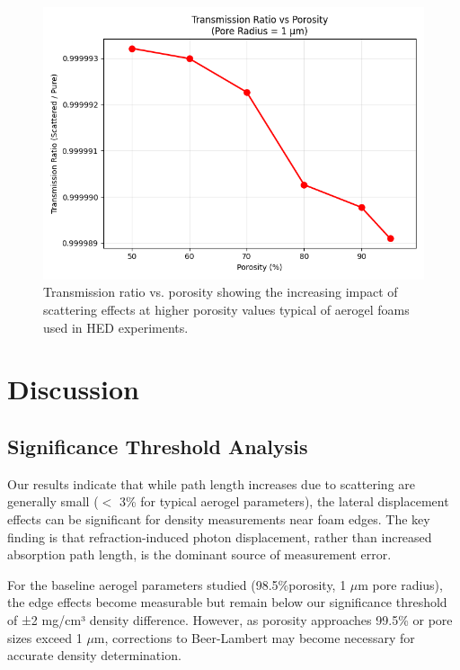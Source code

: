 \documentclass[twocolumn]{aastex701}
\begin{document}
\begin{figure}[htbp]
  \centering
  \includegraphics[width=\linewidth]{transmissionvsporosity1.png}
  \caption{Transmission ratio vs. porosity showing the increasing impact of scattering effects at higher porosity values typical of aerogel foams used in HED experiments.}
  \label{fig:transporeosity}
\end{figure}

\section{Discussion}

\subsection{Significance Threshold Analysis}

Our results indicate that while path length increases due to scattering are generally small ($<$ 3\% for typical aerogel parameters), the lateral displacement effects can be significant for density measurements near foam edges. The key finding is that refraction-induced photon displacement, rather than increased absorption path length, is the dominant source of measurement error.

For the baseline aerogel parameters studied (98.5$\% $porosity, 1 $\mu$m pore radius), the edge effects become measurable but remain below our significance threshold of ±2 mg/cm³ density difference. However, as porosity approaches 99.5\% or pore sizes exceed 1 $\mu$m, corrections to Beer-Lambert may become necessary for accurate density determination.
\end{document}
